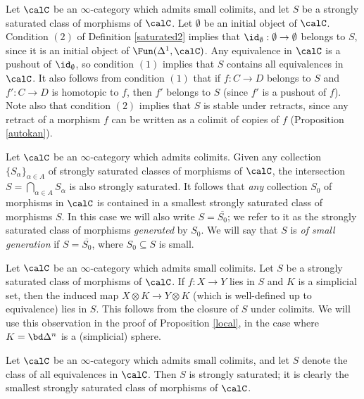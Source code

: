 \begin{remark}\label{simpcons}
Let $\calC$ be an $\infty$-category which admits small colimits, and let
$S$ be a strongly saturated class of morphisms of $\calC$. Let $\emptyset$ be
an initial object of $\calC$. Condition $(2)$ of Definition
\ref{saturated2} implies that $\id_{\emptyset}: \emptyset \rightarrow \emptyset$ belongs to $S$,
since it is an initial object of $\Fun(\Delta^1,\calC)$. Any equivalence in $\calC$ is a pushout of
$\id_{\emptyset}$, so condition $(1)$ implies that $S$ contains all equivalences in $\calC$.
It also follows from condition $(1)$ that if $f: C \rightarrow D$ belongs to $S$ and
$f': C \rightarrow D$ is homotopic to $f$, then $f'$ belongs to $S$ (since $f'$ is a pushout of $f$).
Note also that condition $(2)$ implies that $S$ is stable under retracts, since any retract
of a morphism $f$ can be written as a colimit of copies of $f$ (Proposition \ref{autokan}).
\end{remark}

\begin{remark}\label{sat2}
Let $\calC$ be an $\infty$-category which admits colimits. Given any collection $\{ S_{\alpha} \}_{\alpha \in A}$ of strongly saturated classes of morphisms of $\calC$, the intersection
$S = \bigcap_{\alpha \in A} S_{\alpha}$ is also strongly saturated. It follows that {\em any} collection $S_0$ of morphisms in $\calC$ is contained in a smallest strongly saturated class of morphisms $S$. In this case we will also write $S = \overline{S_0}$; we refer to it as the strongly saturated class of morphisms {\em generated} by $S_0$. We will say that $S$ is {\it of small generation} if $S = \overline{S_0}$, where $S_0 \subseteq S$ is small.
\end{remark}

\begin{remark}
Let $\calC$ be an $\infty$-category which admits small colimits. Let $S$ be a strongly saturated
class of morphisms of $\calC$.
If $f: X \rightarrow Y$ lies in $S$ and $K$ is a simplicial set, then
the induced map $X \otimes K \rightarrow Y \otimes K$ (which is well-defined up to equivalence) lies in $S$. This follows from the closure of $S$ under colimits.
We will use this observation in the proof of Proposition \ref{local}, in the case where $K = \bd \Delta^n$ is a (simplicial) sphere.
\end{remark}

\begin{example}
Let $\calC$ be an $\infty$-category which admits small colimits, and let $S$ denote the class of all equivalences in $\calC$. Then $S$ is strongly saturated; it is clearly the smallest strongly saturated class of morphisms of $\calC$.
\end{example}

